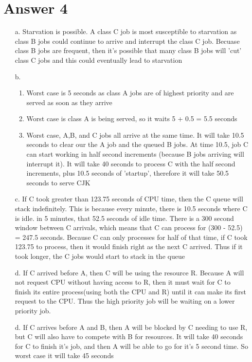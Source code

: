 \documentclass[11pt]{article}
\theoremstyle{definition}
\begin{document}
\section*{Answer 4}
\begin{enumerate}
	\item[a.] Starvation is possible.  A class C job is most susceptible to starvation as class B jobs could continue to arrive and interrupt the class C job.  Becuase class B jobs are frequent,
	then it's possible that many class B jobs will 'cut' class C jobs and this could eventually lead to starvation
	\item[b.] 
		\begin{enumerate}
		\item Worst case is 5 seconds as class A jobs are of highest priority and are served as soon as they arrive
		\item Worst case is class A is being served, so it waits 5 + 0.5 = 5.5 seconds
		\item Worst case, A,B, and C jobs all arrive at the same time.  It will take 10.5 seconds to clear our the A job and the queued B jobs.  At time 10.5, job C can start working in half second increments
		(because B jobs arriving will interrupt it).  It will take 40 seconds to process C with the half second increments, plus 10.5 seconds of 'startup', therefore it will take 50.5 seconds to serve CJK
		\end{enumerate}
	\item[c.] If C took greater than 123.75 seconds of CPU time, then the C queue will stack indefinitely.  This is because every minute, there is 10.5 seconds where C is idle.
	in 5 minutes, that 52.5 seconds of idle time.  There is a 300 second window between C arrivals, which means that C can process for (300 - 52.5) = 247.5 seconds.  Because C can only processes
	for half of that time, if C took 123.75 to process, then it would finish right as the next C arrived.  Thus if it took longer, the C jobs would start to stack in the queue
	
	\item[d.] If C arrived before A, then C will be using the resource R.  Because A will not request CPU without having access to R, then it must wait for C to finish its entire process(using both
	the CPU and R) until it can make its first request to the CPU.  Thus the high priority job will be waiting on a lower priority job.
	
	\item[d.] If C arrives before A and B, then A will be blocked by C needing to use R, but C will also have to compete with B for resources.  It will take 40 seconds for C to finish it's job, and then A will be able to go
	for it's 5 second time.  So worst case it will take 45 seconds
	

\end{enumerate}
\end{document}
